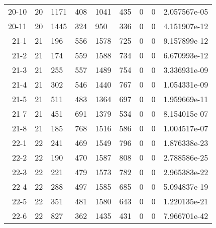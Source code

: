 \documentclass[11pt]{article}
\begin{document}
\begin{tabular}{r|llllllll}
	20-10 & 20            & 1171          & 408           & 1041          &  435          & 0             & 0             &  2.057567e-05\\
	20-11 & 20            & 1445          & 324           &  950          &  336          & 0             & 0             &  4.151907e-12\\
	21-1 & 21            &  196          & 556           & 1578          &  725          & 0             & 0             &  9.157899e-12\\
	21-2 & 21            &  174          & 559           & 1588          &  734          & 0             & 0             &  6.670993e-12\\
	21-3 & 21            &  255          & 557           & 1489          &  754          & 0             & 0             &  3.336931e-09\\
	21-4 & 21            &  302          & 546           & 1440          &  767          & 0             & 0             &  1.054331e-09\\
	21-5 & 21            &  511          & 483           & 1364          &  697          & 0             & 0             &  1.959669e-11\\
	21-7 & 21            &  451          & 691           & 1379          &  534          & 0             & 0             &  8.154015e-07\\
	21-8 & 21            &  185          & 768           & 1516          &  586          & 0             & 0             &  1.004517e-07\\
	22-1 & 22            &  241          & 469           & 1549          &  796          & 0             & 0             &  1.876338e-23\\
	22-2 & 22            &  190          & 470           & 1587          &  808          & 0             & 0             &  2.788586e-25\\
	22-3 & 22            &  221          & 479           & 1573          &  782          & 0             & 0             &  2.965383e-22\\
	22-4 & 22            &  288          & 497           & 1585          &  685          & 0             & 0             &  5.094837e-19\\
	22-5 & 22            &  351          & 481           & 1580          &  643          & 0             & 0             &  1.220135e-21\\
	22-6 & 22            &  827          & 362           & 1435          &  431          & 0             & 0             &  7.966701e-42\\

\end{tabular}
\end{document}
